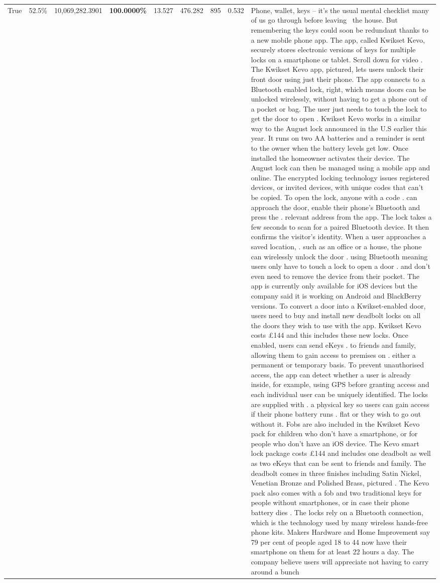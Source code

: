 \begin{table}[H]
\begin{tabular}{lllrlllll}
True & 52.5\% & 10,069,282.3901 & \bfseries \color{red} 100.0000\% & 13.527 & 476.282 & 895 & 0.532 & Phone, wallet, keys – it’s the usual mental checklist many of us go through before leaving  the house. But remembering the keys could soon be redundant thanks to a new mobile phone app. The app, called Kwikset Kevo, securely stores electronic versions of keys for multiple locks on a smartphone or tablet. Scroll down for video . The Kwikset Kevo app, pictured, lets users unlock their front door using just their phone. The app connects to a Bluetooth enabled lock, right, which means doors can be unlocked wirelessly, without having to get a phone out of a pocket or bag. The user just needs to touch the lock to get the door to open . Kwikset Kevo works in a similar way to the August lock announced in the U.S earlier this year. It runs on two AA batteries and a reminder is sent to the owner when the battery levels get low. Once installed the homeowner activates their device. The August lock can then be managed using a mobile app and online. The encrypted locking technology issues registered devices, or invited devices, with unique codes that can't be copied. To open the lock, anyone with a code . can approach the door, enable their phone's Bluetooth and press the . relevant address from the app. The lock takes a few seconds to scan for a paired Bluetooth device. It then confirms the visitor's identity. When a user approaches a saved location, . such as an office or a house, the phone can wirelessly unlock the door . using Bluetooth meaning users only have to touch a lock to open a door . and don't even need to remove the device from their pocket. The app is currently only available for iOS devices but the company said it is working on Android and BlackBerry versions. To convert a door into a Kwikset-enabled door, users need to buy and install new deadbolt locks on all the doors they wish to use with the app. Kwikset Kevo costs £144 and this includes these new locks. Once enabled, users can send eKeys . to friends and family, allowing them to gain access to premises on . either a permanent or temporary basis. To prevent unauthorised access, the app can detect whether a user is already inside, for example, using GPS before granting access and each individual user can be uniquely identified. The locks are supplied with . a physical key so users can gain access if their phone battery runs . flat or they wish to go out without it. Fobs are also included in the Kwikset Kevo pack for children who don't have a smartphone, or for people who don't have an iOS device. The Kevo smart lock package costs £144 and includes one deadbolt as well as two eKeys that can be sent to friends and family. The deadbolt comes in three finishes including Satin Nickel, Venetian Bronze and Polished Brass, pictured . The Kevo pack also comes with a fob and two traditional keys for people without smartphones, or in case their phone battery dies . The locks rely on a Bluetooth connection, which is the technology used by many wireless hands-free phone kits. Makers Hardware and Home Improvement say 79 per cent of people aged 18 to 44 now have their smartphone on them for at least 22 hours a day. The company believe users will appreciate not having to carry around a bunch 
\end{tabular}
\end{table}
